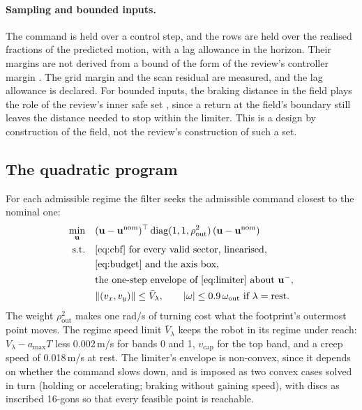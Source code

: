 \documentclass[11pt]{article}
\theoremstyle{definition}
\begin{document}
\paragraph{Sampling and bounded inputs.} The command is held over a control step, and the rows are held over the realised
fractions of the predicted motion, with a lag allowance in the horizon. Their margins are not derived from a bound of the
form of the review's controller margin \citep[Sec.~7.2]{garg2024advances}. The grid margin and the scan residual are
measured, and the lag allowance is declared. For bounded inputs, the braking distance in the field plays the role of the
review's inner safe set \citep[Sec.~4]{garg2024advances}, since a return at the field's boundary still leaves the distance
needed to stop within the limiter. This is a design by construction of the field, not the review's construction of such a
set.

\subsection{The quadratic program}
For each admissible regime the filter seeks the admissible command closest to the nominal one:
\begin{equation}
\begin{aligned}
\min_{\mathbf{u}}\quad&(\mathbf{u}-\mathbf{u}^{\mathrm{nom}})^\top\operatorname{diag}(1,1,\rho_{\mathrm{out}}^2)\,(\mathbf{u}-\mathbf{u}^{\mathrm{nom}})\\
\text{s.t.}\quad&\eqref{eq:cbf}\ \text{for every valid sector, linearised},\\
&\eqref{eq:budget}\ \text{and the axis box},\\
&\text{the one-step envelope of \eqref{eq:limiter} about }\mathbf{u}^-,\\
&\|(v_x,v_y)\|\le\bar V_\lambda,\qquad|\omega|\le0.9\,\omega_{\mathrm{out}}\ \text{if}\ \lambda=\mathrm{rest}.
\end{aligned}
\label{eq:qp}
\end{equation}
The weight $\rho_{\mathrm{out}}^2$ makes one rad/s of turning cost what the footprint's outermost point
moves. The regime speed limit $\bar V_\lambda$ keeps the robot in its regime under reach: $V_\lambda-a_{\max}
T$ less 0.002\,m/s for bands 0 and 1, $v_{\mathrm{cap}}$ for the top band, and a creep speed of 0.018\,m/s
at rest. The limiter's envelope is non-convex, since it depends on whether the command slows down, and is
imposed as two convex cases solved in turn (holding or accelerating; braking without gaining speed), with
discs as inscribed 16-gons so that every feasible point is reachable.
\end{document}
